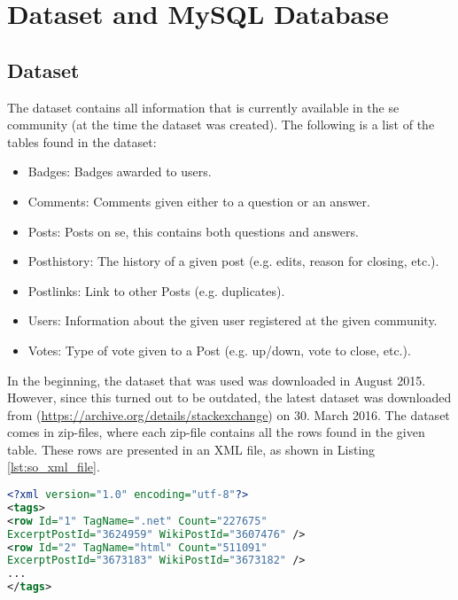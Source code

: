 \label{chap:chapter3}

\section{Dataset and MySQL Database}
\label{sec:dataset_db}

\subsection{Dataset}
The dataset contains all information that is currently available in the \gls{se} community (at the time the dataset was created). 
The following is a list of the tables found in the dataset:
\begin{itemize}
	\item Badges: Badges awarded to users.
	\item Comments: Comments given either to a question or an answer.
	\item Posts: Posts on \gls{se}, this contains both questions and answers.
	\item Posthistory: The history of a given post (e.g. edits, reason for closing, etc.).
	\item Postlinks: Link to other Posts (e.g. duplicates).
	\item Users: Information about the given user registered at the given community.
	\item Votes: Type of vote given to a Post (e.g. up/down, vote to close, etc.).
\end{itemize}
In the beginning, the dataset that was used was downloaded in August 2015. 
However, since this turned out to be outdated, the latest dataset was downloaded from (\url{https://archive.org/details/stackexchange}) on 30. March 2016. 
The dataset comes in zip-files, where each zip-file contains all the rows found in the given table. 
These rows are presented in an XML file, as shown in Listing \ref{lst:so_xml_file}.
\begin{lstlisting}[caption={Content in stackoverflow.com-Tags.xml}, label={lst:so_xml_file}, language={XML}] 
<?xml version="1.0" encoding="utf-8"?>
<tags>
<row Id="1" TagName=".net" Count="227675" 
ExcerptPostId="3624959" WikiPostId="3607476" />
<row Id="2" TagName="html" Count="511091" 
ExcerptPostId="3673183" WikiPostId="3673182" />
...
</tags>
\end{lstlisting}

